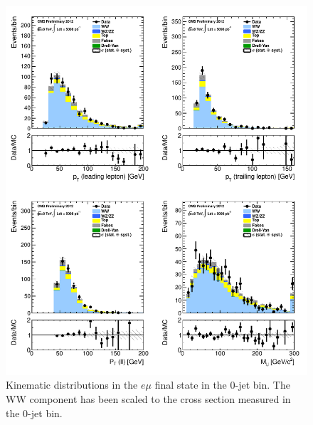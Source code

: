 \begin{figure}[!hbtp]
\centering
\includegraphics[width=1\textwidth]{figures/ww_analysis20_0_ALL_em_0j.pdf} %
\caption{Kinematic distributions in the $e\mu$ final state in the 0-jet bin.
The WW component has been scaled to the cross section measured in the 0-jet bin.}
\label{fig:xs_kinematics_em_0j}
\end{figure}
